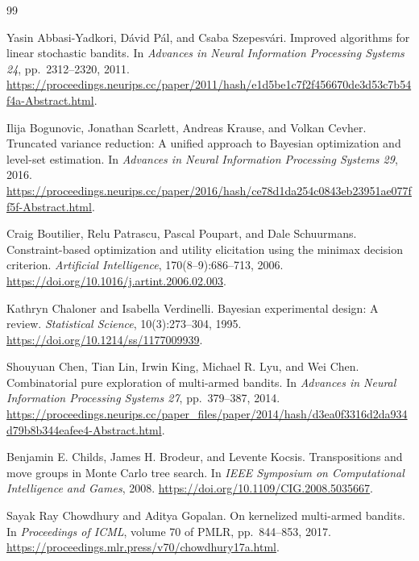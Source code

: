 \documentclass{article}
\theoremstyle{plain}
\theoremstyle{definition}
\begin{document}
\begin{thebibliography}{99}

Yasin Abbasi-Yadkori, D\'avid P\'al, and Csaba Szepesv\'ari.
Improved algorithms for linear stochastic bandits.
In \emph{Advances in Neural Information Processing Systems 24}, pp.\ 2312--2320, 2011.
\url{https://proceedings.neurips.cc/paper/2011/hash/e1d5be1c7f2f456670de3d53c7b54f4a-Abstract.html}.

Ilija Bogunovic, Jonathan Scarlett, Andreas Krause, and Volkan Cevher.
Truncated variance reduction: A unified approach to Bayesian optimization and level-set estimation.
In \emph{Advances in Neural Information Processing Systems 29}, 2016.
\url{https://proceedings.neurips.cc/paper/2016/hash/ce78d1da254c0843eb23951ae077ff5f-Abstract.html}.

Craig Boutilier, Relu Patrascu, Pascal Poupart, and Dale Schuurmans.
Constraint-based optimization and utility elicitation using the minimax decision criterion.
\emph{Artificial Intelligence}, 170(8--9):686--713, 2006.
\url{https://doi.org/10.1016/j.artint.2006.02.003}.

Kathryn Chaloner and Isabella Verdinelli.
Bayesian experimental design: A review.
\emph{Statistical Science}, 10(3):273--304, 1995.
\url{https://doi.org/10.1214/ss/1177009939}.

Shouyuan Chen, Tian Lin, Irwin King, Michael R. Lyu, and Wei Chen.
Combinatorial pure exploration of multi-armed bandits.
In \emph{Advances in Neural Information Processing Systems 27}, pp.\ 379--387, 2014.
\url{https://proceedings.neurips.cc/paper_files/paper/2014/hash/d3ea0f3316d2da934d79b8b344eafee4-Abstract.html}.

Benjamin E. Childs, James H. Brodeur, and Levente Kocsis.
Transpositions and move groups in Monte Carlo tree search.
In \emph{IEEE Symposium on Computational Intelligence and Games}, 2008.
\url{https://doi.org/10.1109/CIG.2008.5035667}.

Sayak Ray Chowdhury and Aditya Gopalan.
On kernelized multi-armed bandits.
In \emph{Proceedings of ICML}, volume 70 of PMLR, pp.\ 844--853, 2017.
\url{https://proceedings.mlr.press/v70/chowdhury17a.html}.


\end{thebibliography}
\end{document}
